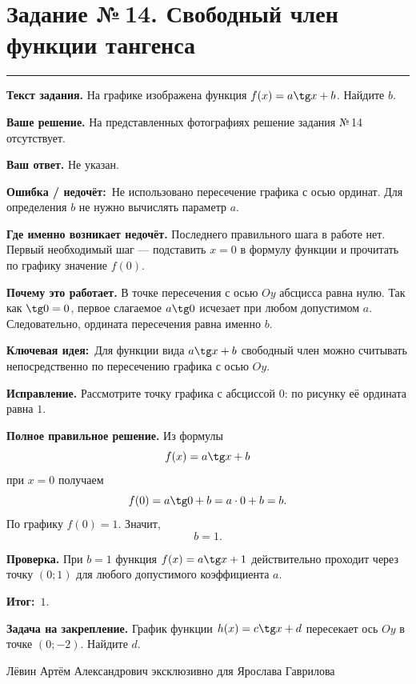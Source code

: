 \documentclass[a4paper,11pt]{article}
\newcommand{\rlabel}[1]{\par\noindent\textbf{\color{darkaccent}#1}\quad}
\newcommand{\errorlabel}{\textcolor{err}{\textbf{Ошибка / недочёт:}}}
\newcommand{\keylabel}{\textcolor{blue!60!black}{\textbf{Ключевая идея:}}}
\newcommand{\finallabel}{\textcolor{teal!60!black}{\textbf{Итог:}}}
\newcommand{\tasktitle}[2]{\clearpage\phantomsection\label{task:#1}\section*{Задание №\,#1. #2}\vspace{-3mm}\textcolor{accent}{\rule{\linewidth}{0.45pt}}}
\begin{document}
\tasktitle{14}{Свободный член функции тангенса}
\rlabel{Текст задания.} На графике изображена функция $f(x)=a\tg x+b$. Найдите $b$.
\rlabel{Ваше решение.} На представленных фотографиях решение задания №\,14 отсутствует.
\rlabel{Ваш ответ.} Не указан.
\par\noindent\errorlabel\ Не использовано пересечение графика с осью ординат. Для определения $b$ не нужно вычислять параметр $a$.
\rlabel{Где именно возникает недочёт.} Последнего правильного шага в работе нет. Первый необходимый шаг --- подставить $x=0$ в формулу функции и прочитать по графику значение $f(0)$.
\rlabel{Почему это работает.} В точке пересечения с осью $Oy$ абсцисса равна нулю. Так как $\tg0=0$, первое слагаемое $a\tg0$ исчезает при любом допустимом $a$. Следовательно, ордината пересечения равна именно $b$.
\par\noindent\keylabel\ Для функции вида $a\tg x+b$ свободный член можно считывать непосредственно по пересечению графика с осью $Oy$.
\rlabel{Исправление.} Рассмотрите точку графика с абсциссой $0$: по рисунку её ордината равна $1$.
\rlabel{Полное правильное решение.} Из формулы
\[
f(x)=a\tg x+b
\]
при $x=0$ получаем
\[
f(0)=a\tg0+b=a\cdot0+b=b.
\]
По графику $f(0)=1$. Значит,
\[
b=1.
\]
\rlabel{Проверка.} При $b=1$ функция $f(x)=a\tg x+1$ действительно проходит через точку $(0;1)$ для любого допустимого коэффициента $a$.
\par\noindent\finallabel\ $\boxed{1}$.
\rlabel{Задача на закрепление.} График функции $h(x)=c\tg x+d$ пересекает ось $Oy$ в точке $(0;-2)$. Найдите $d$.

\vfill
\begin{center}\small\color{ink}Лёвин Артём Александрович эксклюзивно для Ярослава Гаврилова\end{center}
\end{document}
